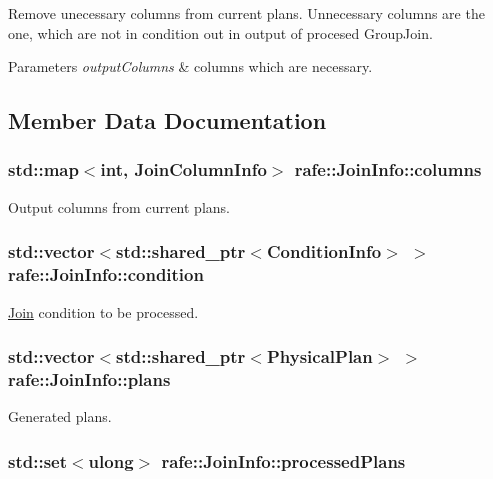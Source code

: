 Remove unecessary columns from current plans. Unnecessary columns are the one, which are not in condition out in output of procesed Group\+Join. 
\begin{DoxyParams}{Parameters}
{\em output\+Columns} & columns which are necessary. \\
\hline
\end{DoxyParams}


\subsection{Member Data Documentation}
\hypertarget{classrafe_1_1_join_info_a368a23397966ad965bf6de58d4471760}{
\subsubsection[{columns}]{\setlength{\rightskip}{0pt plus 5cm}std\+::map$<$int, {\bf Join\+Column\+Info}$>$ rafe\+::\+Join\+Info\+::columns}}\label{classrafe_1_1_join_info_a368a23397966ad965bf6de58d4471760}
Output columns from current plans. \hypertarget{classrafe_1_1_join_info_a129f469fae807daf5195e930587050eb}{
\subsubsection[{condition}]{\setlength{\rightskip}{0pt plus 5cm}std\+::vector$<$std\+::shared\+\_\+ptr$<${\bf Condition\+Info}$>$ $>$ rafe\+::\+Join\+Info\+::condition}}\label{classrafe_1_1_join_info_a129f469fae807daf5195e930587050eb}
\hyperlink{classrafe_1_1_join}{Join} condition to be processed. \hypertarget{classrafe_1_1_join_info_a1708cd5a22856820424f962b09066971}{
\subsubsection[{plans}]{\setlength{\rightskip}{0pt plus 5cm}std\+::vector$<$std\+::shared\+\_\+ptr$<${\bf Physical\+Plan}$>$ $>$ rafe\+::\+Join\+Info\+::plans}}\label{classrafe_1_1_join_info_a1708cd5a22856820424f962b09066971}
Generated plans. \hypertarget{classrafe_1_1_join_info_aac96010c2f7c715f90e85e5ac25b31df}{
\subsubsection[{processed\+Plans}]{\setlength{\rightskip}{0pt plus 5cm}std\+::set$<$ulong$>$ rafe\+::\+Join\+Info\+::processed\+Plans}}\label{classrafe_1_1_join_info_aac96010c2f7c715f90e85e5ac25b31df}
